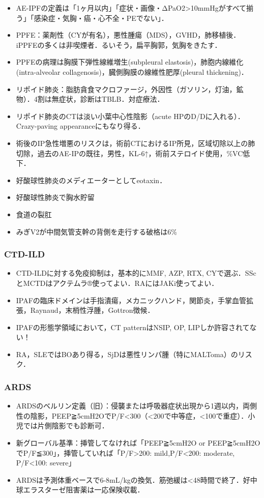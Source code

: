 \begin{itemize}
\item AE-IPFの定義は「1ヶ月以内」「症状・画像・ΔPaO2>10mmHgがすべて揃う」「感染症・気胸・癌・心不全・PEでない」．
\item PPFE：薬剤性（CYが有名），悪性腫瘍（MDS），GVHD，肺移植後．iPPFEの多くは非喫煙者．るいそう，扁平胸郭，気胸をきたす．
\item PPFEの病理は胸膜下弾性線維増生(subpleural elastosis)，肺胞内線維化(intra-alveolar collagenosis)，臓側胸膜の線維性肥厚(pleural thickening)．
\item リポイド肺炎：脂肪貪食マクロファージ，外因性（ガソリン，灯油，鉱物）．4割は無症状，診断はTBLB．対症療法．
\item リポイド肺炎のCTは淡い小葉中心性陰影（acute HPのD/Dに入れる）．Crazy-paving appearanceにもなり得る．
\item 術後のIP急性増悪のリスクは，術前CTにおけるIP所見，区域切除以上の肺切除，過去のAE-IPの既往，男性，KL-6↑，術前ステロイド使用，\%VC低下．
\item 好酸球性肺炎のメディエーターとしてeotaxin．





\item 好酸球性肺炎で胸水貯留
\item 食道の裂肛
\item みぎV2が中間気管支幹の背側を走行する破格は6\%

\end{itemize}


\subsubsection{CTD-ILD}
\begin{itemize}
\item CTD-ILDに対する免疫抑制は，基本的にMMF, AZP, RTX, CYで選ぶ．SScとMCTDはアクテムラ®使ってよい．RAにはJAKi使ってよい．
\item IPAFの臨床ドメインは手指潰瘍，メカニックハンド，関節炎，手掌血管拡張，Raynaud，末梢性浮腫，Gottron徴候．
\item IPAFの形態学領域において，CT patternはNSIP, OP, LIPしか許容されてない！
\item RA，SLEではBOあり得る，SjDは悪性リンパ腫（特にMALToma）のリスク．
\end{itemize}

\subsubsection{ARDS}
\begin{itemize}
\item ARDSのベルリン定義（旧）：侵襲または呼吸器症状出現から1週以内，両側性の陰影，PEEP≧5cmH2OでP/F<300（<200で中等症，<100で重症）．小児では片側陰影でも診断可．
\item 新グローバル基準：挿管してなければ「PEEP≧5cmH2O or PEEP≧5cmH2OでP/F≦300」，挿管していれば「P/F>200: mild,P/F<200: moderate, P/F<100: severe」
\item ARDSは予測体重ベースで6-8mL/kgの換気．筋弛緩は<48時間で終了．好中球エラスターゼ阻害薬は一応保険収載．
\end{itemize}


